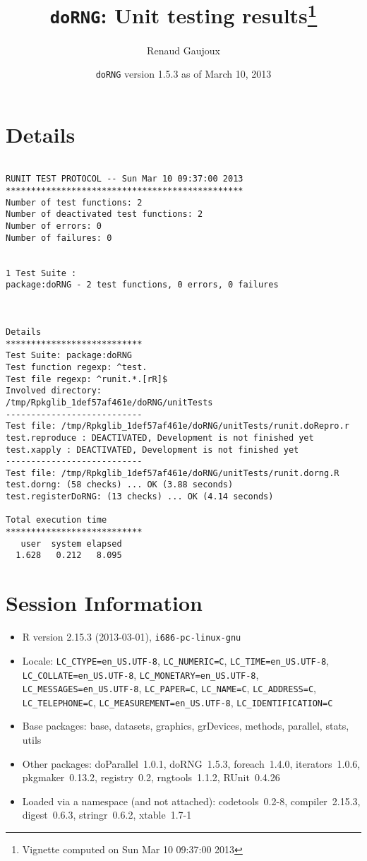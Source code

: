 \documentclass[10pt]{article}
\author{Renaud Gaujoux}
\title{\texttt{doRNG}: Unit testing results\footnote{Vignette computed  on Sun Mar 10 09:37:00 2013}}
\date{\texttt{doRNG} version 1.5.3 as of March 10, 2013}
\begin{document}
\maketitle

\section{Details}
\begin{verbatim}

RUNIT TEST PROTOCOL -- Sun Mar 10 09:37:00 2013 
*********************************************** 
Number of test functions: 2 
Number of deactivated test functions: 2 
Number of errors: 0 
Number of failures: 0 

 
1 Test Suite : 
package:doRNG - 2 test functions, 0 errors, 0 failures



Details 
*************************** 
Test Suite: package:doRNG 
Test function regexp: ^test. 
Test file regexp: ^runit.*.[rR]$ 
Involved directory: 
/tmp/Rpkglib_1def57af461e/doRNG/unitTests 
--------------------------- 
Test file: /tmp/Rpkglib_1def57af461e/doRNG/unitTests/runit.doRepro.r 
test.reproduce : DEACTIVATED, Development is not finished yet
test.xapply : DEACTIVATED, Development is not finished yet
--------------------------- 
Test file: /tmp/Rpkglib_1def57af461e/doRNG/unitTests/runit.dorng.R 
test.dorng: (58 checks) ... OK (3.88 seconds)
test.registerDoRNG: (13 checks) ... OK (4.14 seconds)

Total execution time
***************************
   user  system elapsed 
  1.628   0.212   8.095 

\end{verbatim}

\section*{Session Information}
\begin{itemize}\raggedright
  \item R version 2.15.3 (2013-03-01), \verb|i686-pc-linux-gnu|
  \item Locale: \verb|LC_CTYPE=en_US.UTF-8|, \verb|LC_NUMERIC=C|, \verb|LC_TIME=en_US.UTF-8|, \verb|LC_COLLATE=en_US.UTF-8|, \verb|LC_MONETARY=en_US.UTF-8|, \verb|LC_MESSAGES=en_US.UTF-8|, \verb|LC_PAPER=C|, \verb|LC_NAME=C|, \verb|LC_ADDRESS=C|, \verb|LC_TELEPHONE=C|, \verb|LC_MEASUREMENT=en_US.UTF-8|, \verb|LC_IDENTIFICATION=C|
  \item Base packages: base, datasets, graphics, grDevices, methods,
    parallel, stats, utils
  \item Other packages: doParallel~1.0.1, doRNG~1.5.3, foreach~1.4.0,
    iterators~1.0.6, pkgmaker~0.13.2, registry~0.2, rngtools~1.1.2,
    RUnit~0.4.26
  \item Loaded via a namespace (and not attached): codetools~0.2-8,
    compiler~2.15.3, digest~0.6.3, stringr~0.6.2, xtable~1.7-1
\end{itemize}
\end{document}
